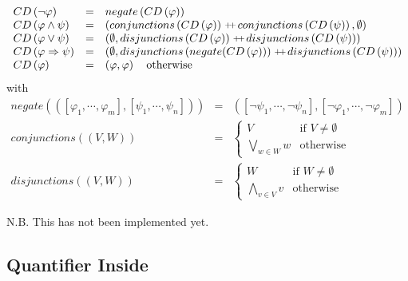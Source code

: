 \begin{equation*}
\begin{array}{lll}
CD\left( \lnot \varphi \right) & = & negate\left( CD\left( \varphi \right)
\right) \\
CD\left( \varphi \wedge \psi \right) & = & \left( conjunctions\left(
CD\left( \varphi \right) \right) \concat conjunctions\left( CD\left( \psi
\right) \right) ,\emptyset \right) \\
CD\left( \varphi \vee \psi \right) & = & \left( \emptyset
,disjunctions\left( CD\left( \varphi \right) \right) \concat %
disjunctions\left( CD\left( \psi \right) \right) \right) \\
CD\left( \varphi \Rightarrow \psi \right) & = & \left( \emptyset
,disjunctions\left( negate(CD\left( \varphi \right) )\right) \concat %
disjunctions\left( CD\left( \psi \right) \right) \right) \\
CD\left( \varphi \right) & = & \left( \varphi ,\varphi \right) \text{
otherwise}%
\end{array}%
\end{equation*}%
with%
\begin{equation*}
\begin{array}{lll}
negate\left( \left( \left[ \varphi _{1},\cdots ,\varphi _{m}\right] ,\left[
\psi _{1},\cdots ,\psi _{n}\right] \right) \right) & = & \left( \left[ \lnot
\psi _{1},\cdots ,\lnot \psi _{n}\right] ,\left[ \lnot \varphi _{1},\cdots
,\lnot \varphi _{m}\right] \right) \\
conjunctions\left( \left( V,W\right) \right) & = & \left\{
\begin{array}{ll}
V & \text{if }V\neq \emptyset \\
\bigvee\limits_{w\in W}w & \text{otherwise}%
\end{array}%
\right. \\
disjunctions\left( \left( V,W\right) \right) & = & \left\{
\begin{array}{ll}
W & \text{if }W\neq \emptyset \\
\bigwedge\limits_{v\in V}v & \text{otherwise}%
\end{array}%
\right.%
\end{array}%
\end{equation*}

N.B. This has not been implemented yet.\newpage

\subsection{Quantifier Inside}

